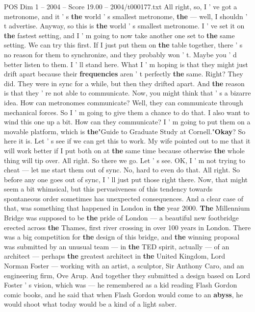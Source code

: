 \begin{textsample}{POS Dim 1 – 2004 – Score 19.00 – 2004/t000177.txt}
All right, so, I ' ve got a metronome, and it ' s \textbf{the} world ' s smallest metronome, \textbf{the} — well, I shouldn ' t advertise.
Anyway, so this is \textbf{the} world ' s smallest metronome.
I ' ve set it on \textbf{the} fastest setting, and I ' m going to now take another one set to \textbf{the} same setting.
We can try this first.
If I just put them on \textbf{the} table together, there ' s no reason for them to synchronize, and they probably won ' t.
Maybe you ' d better listen to them.
I ' ll stand here.
What I ' m hoping is that they might just drift apart because their \textbf{frequencies} aren ' t perfectly \textbf{the} same.
Right?
They did.
They were in sync for a while, but then they drifted apart.
And \textbf{the} reason is that they ' re not able to communicate.
Now, you might think that ' s a bizarre idea.
How can metronomes communicate?
Well, they can communicate through mechanical forces.
So I ' m going to give them a chance to do that.
I also want to wind this one up a bit.
How can they communicate?
I ' m going to put them on a movable platform, which is \textbf{the}"Guide to Graduate Study at Cornell."\textbf{Okay}?
So here it is.
Let ' s see if we can get this to work.
My wife pointed out to me that it will work better if I put both on at \textbf{the} same time because otherwise \textbf{the} whole thing will tip over.
All right.
So there we go.
Let ' s see.
OK, I ' m not trying to cheat — let me start them out of sync.
No, hard to even do that.
All right.
So before any one goes out of sync, I ' ll just put those right there.
Now, that might seem a bit whimsical, but this pervasiveness of this tendency towards spontaneous order sometimes has unexpected consequences.
And a clear case of that, was something that happened in London in \textbf{the} year 2000. \textbf{The} Millennium Bridge was supposed to be \textbf{the} pride of London — a beautiful new footbridge erected across \textbf{the} Thames, first river crossing in over 100 years in London.
There was a big competition for \textbf{the} design of this bridge, and \textbf{the} winning proposal was submitted by an unusual team — in \textbf{the} TED spirit, actually — of an architect — perhaps \textbf{the} greatest architect in \textbf{the} United Kingdom, Lord Norman Foster — working with an artist, a sculptor, Sir Anthony Caro, and an engineering firm, Ove Arup.
And together they submitted a design based on Lord Foster ' s vision, which was — he remembered as a kid reading Flash Gordon comic books, and he said that when Flash Gordon would come to an \textbf{abyss}, he would shoot what today would be a kind of a light saber.

\end{textsample}
